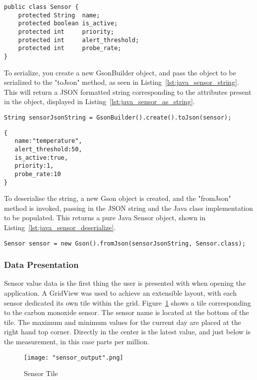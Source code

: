 \documentclass{article}
\begin{document}
\begin{lstlisting}[caption={Sensor object to be serialized},label={lst:java_sensor_obj}]
public class Sensor {
    protected String  name;
    protected boolean is_active;
    protected int     priority;
    protected int     alert_threshold;
    protected int     probe_rate;
}
\end{lstlisting}	

\noindent
To serialize, you create a new GsonBuilder object, and pass the object to be serialized to the "toJson" method, as seen in Listing~\ref{lst:java_sensor_string}. This will return a JSON formatted string corresponding to the attributes present in the object, displayed in Listing~\ref{lst:java_sensor_as_string}.

\begin{lstlisting}[caption={Serialize object to string},label={lst:java_sensor_string}]
String sensorJsonString = GsonBuilder().create().toJson(sensor);
\end{lstlisting}

\newpage
\begin{lstlisting}[caption={Sensor string resulting from serialization},label={lst:java_sensor_as_string}]
{  
   name:"temperature",
   alert_threshold:50,
   is_active:true,
   priority:1,
   probe_rate:10
}
\end{lstlisting}

\noindent
To deserialise the string, a new Gson object is created, and the "fromJson" method is invoked, passing in the JSON string and the Java class implementation to be populated. This returns a pure Java Sensor object, shown in Listing~\ref{lst:java_sensor_deserialize}.

\begin{lstlisting}[caption={Deserialize string to sensor object},label={lst:java_sensor_deserialize}]
Sensor sensor = new Gson().fromJson(sensorJsonString, Sensor.class);
\end{lstlisting}	

\subsubsection{Data Presentation}
Sensor value data is the first thing the user is presented with when opening the application. A GridView was used to achieve an extensible layout, with each sensor dedicated its own tile within the grid. Figure~\ref{fig:android_sensor_tile} shows a tile corresponding to the carbon monoxide sensor.  The sensor name is located at the bottom of the tile. The maximum and minimum values for the current day are placed at the right hand top corner. Directly in the center is the latest value, and just below is the measurement, in this case parts per million.
\begin{figure}[H]
\centering
\texttt{[image: "sensor\_output".png]}
\caption{Sensor Tile}
\label{fig:android_sensor_tile}
\end{figure}
\end{document}
